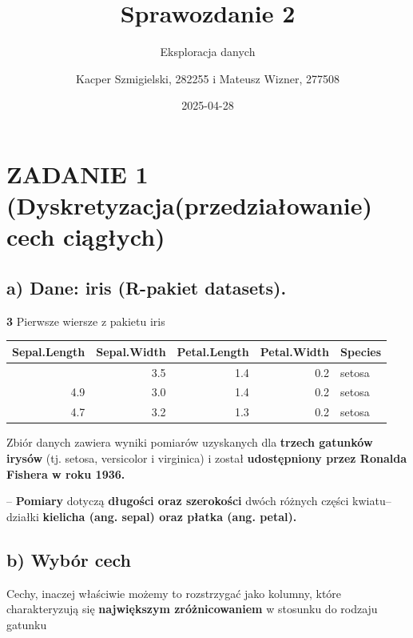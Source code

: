 \documentclass[
  12pt,
]{article}
\title{Sprawozdanie 2}
\subtitle{Eksploracja danych}
\author{Kacper Szmigielski, 282255 i Mateusz Wizner, 277508}
\date{2025-04-28}
\begin{document}
\maketitle

{
\setcounter{tocdepth}{3}
\tableofcontents
}
\section{ZADANIE 1 (Dyskretyzacja(przedziałowanie) cech
ciągłych)}\label{zadanie-1-dyskretyzacjaprzedziaux142owanie-cech-ciux105gux142ych}

\subsection{a) Dane: iris (R-pakiet
datasets).}\label{a-dane-iris-r-pakiet-datasets.}

\textbf{3} Pierwsze wiersze z pakietu iris

\begin{longtable}[]{@{}rrrrl@{}}
\toprule\noalign{}
Sepal.Length & Sepal.Width & Petal.Length & Petal.Width & Species \\
\midrule\noalign{}
\endhead
\bottomrule\noalign{}
\endlastfoot
5.1 & 3.5 & 1.4 & 0.2 & setosa \\
4.9 & 3.0 & 1.4 & 0.2 & setosa \\
4.7 & 3.2 & 1.3 & 0.2 & setosa \\
\end{longtable}

Zbiór danych zawiera wyniki pomiarów uzyskanych dla \textbf{trzech
gatunków irysów} (tj. setosa, versicolor i virginica) i został
\textbf{udostępniony przez Ronalda Fishera w roku 1936.}

-- \textbf{Pomiary} dotyczą \textbf{długości oraz szerokości} dwóch
różnych części kwiatu-- działki \textbf{kielicha (ang. sepal) oraz
płatka (ang. petal).}

\subsection{b) Wybór cech}\label{b-wybuxf3r-cech}

Cechy, inaczej właściwie możemy to rozstrzygać jako kolumny, które
charakteryzują się \textbf{największym zróżnicowaniem} w stosunku do
rodzaju gatunku
\end{document}
